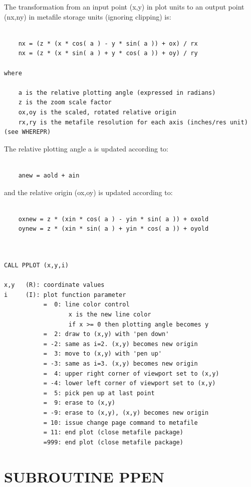 \documentclass[11pt]{report}
\begin{document}
The transformation from an input point (x,y) in plot units to an output point
(nx,ny) in metafile storage units (ignoring clipping) is:
\begin{verbatim}

    nx = (z * (x * cos( a ) - y * sin( a )) + ox) / rx
    nx = (z * (x * sin( a ) + y * cos( a )) + oy) / ry

where

    a is the relative plotting angle (expressed in radians)
    z is the zoom scale factor
    ox,oy is the scaled, rotated relative origin
    rx,ry is the metafile resolution for each axis (inches/res unit)
(see WHEREPR)
\end{verbatim}
The relative plotting angle a is updated according to:
\begin{verbatim}

    anew = aold + ain

\end{verbatim}
and the relative origin (ox,oy) is updated according to:
\begin{verbatim}

    oxnew = z * (xin * cos( a ) - yin * sin( a )) + oxold
    oynew = z * (xin * sin( a ) + yin * cos( a )) + oyold
	
\end{verbatim}
\begin{verbatim}

CALL PPLOT (x,y,i)

x,y   (R): coordinate values
i     (I): plot function parameter
           =  0: line color control
                  x is the new line color
                  if x >= 0 then plotting angle becomes y
           =  2: draw to (x,y) with 'pen down'
           = -2: same as i=2. (x,y) becomes new origin
           =  3: move to (x,y) with 'pen up'
           = -3: same as i=3. (x,y) becomes new origin
           =  4: upper right corner of viewport set to (x,y)
           = -4: lower left corner of viewport set to (x,y)
           =  5: pick pen up at last point
           =  9: erase to (x,y)
           = -9: erase to (x,y), (x,y) becomes new origin
           = 10: issue change page command to metafile
           = 11: end plot (close metafile package)
           =999: end plot (close metafile package)
\end{verbatim}

\section{SUBROUTINE PPEN}
\end{document}
